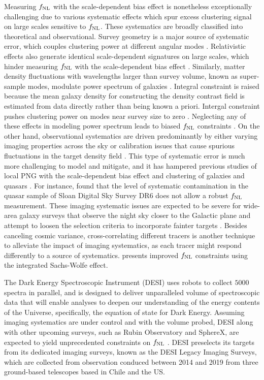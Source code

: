 Measuring $f_{\rm NL}$ with the scale-dependent bias effect is nonetheless exceptionally challenging due to various systematic effects which spur excess clustering signal on large scales sensitive to $f_{\rm NL}$. These systematics are broadly classified into theoretical and observational. Survey geometry is a major source of systematic error, which couples clustering power at different angular modes \citep{beutler2014clustering,wilson2017rapid}. Relativistic effects also generate identical scale-dependent signatures on large scales, which hinder measuring $f_{\rm NL}$ with the scale-dependent bias effect \citep{wang2020}. Similarly, matter density fluctuations with wavelengths larger than survey volume, known as super-sample modes, modulate power spectrum of galaxies \citep{castorina2020JCAP}. Integral constraint is raised because the mean galaxy density for constructing the density contrast field is estimated from data directly rather than being known a priori. Intergal constraint pushes clustering power on modes near survey size to zero \citep{peacock1991large,de2019integral}. Neglecting any of these effects in modeling power spectrum leads to biased $f_{\rm NL}$ constraints \citep[see, e.g.,]{riquelme2022primordial}. On the other hand, observational systematics are driven predominantly by either varying imaging properties across the sky \citep{ross2011} or calibration issues that cause spurious fluctuations in the target density field \citep{huterer2013calibration}. This type of systematic error is much more challenging to model and mitigate, and it has hampered previous studies of local PNG with the scale-dependent bias effect and clustering of galaxies and quasars \citep[see, e.g.,][]{Ho2015JCAP...05..040H}. For instance, \cite{pullen2013systematic} found that the level of systematic contamination in the quasar sample of Sloan Digital Sky Survey DR6 does not allow a robust $f_{\rm NL}$ measurement. These imaging systematic issues are expected to be severe for wide-area galaxy surveys that observe the night sky closer to the Galactic plane and attempt to loosen the selection criteria to incorporate fainter targets \citep[see, e.g,][]{kitanidis2020imaging}. Besides canceling cosmic variance, cross-correlating different tracers is another technique to alleviate the impact of imaging systematics, as each tracer might respond differently to a source of systematics. \cite{giannantonio2014improved} presents improved $f_{\rm NL}$ constraints using the integrated Sachs-Wolfe effect.

The Dark Energy Spectroscopic Instrument (DESI) uses robots to collect $5000$ spectra in parallel, and is designed to deliver unparalleled volume of spectroscopic data that will enable analyses to deepen our understanding of the energy contents of the Universe, specifically, the equation of state for Dark Energy. Assuming imaging systematics are under control and with the volume probed, DESI along with other upcoming surveys, such as Rubin Observatory and SphereX, are expected to yield unprecedented constraints on $f_{\rm NL}$ \citep[see, e.g.,][]{Heinrich2022AAS...24020203H}. DESI preselects its targets from its dedicated imaging surveys, known as the DESI Legacy Imaging Surveys, which are collected from observation conduced between 2014 and 2019 from three ground-based telescopes based in Chile and the US.

